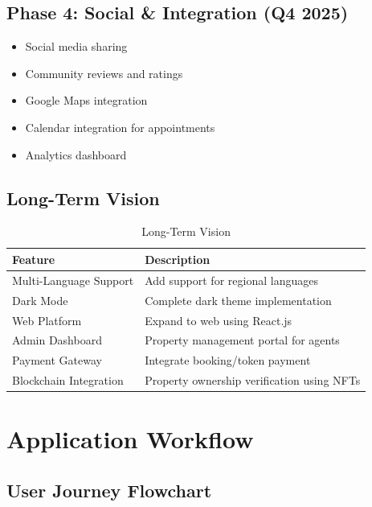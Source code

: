 \documentclass[11pt,a4paper,oneside]{book}
\begin{document}
\section{Phase 4: Social \& Integration (Q4 2025)}

\begin{itemize}
    \item Social media sharing
    \item Community reviews and ratings
    \item Google Maps integration
    \item Calendar integration for appointments
    \item Analytics dashboard
\end{itemize}

\section{Long-Term Vision}

\begin{table}[h]
\centering
\begin{tabularx}{\textwidth}{l X}
\toprule
\textbf{Feature} & \textbf{Description} \\
\midrule
Multi-Language Support & Add support for regional languages \\
Dark Mode & Complete dark theme implementation \\
Web Platform & Expand to web using React.js \\
Admin Dashboard & Property management portal for agents \\
Payment Gateway & Integrate booking/token payment \\
Blockchain Integration & Property ownership verification using NFTs \\
\bottomrule
\end{tabularx}
\caption{Long-Term Vision}
\end{table}

\chapter{Application Workflow}

\section{User Journey Flowchart}
\end{document}

